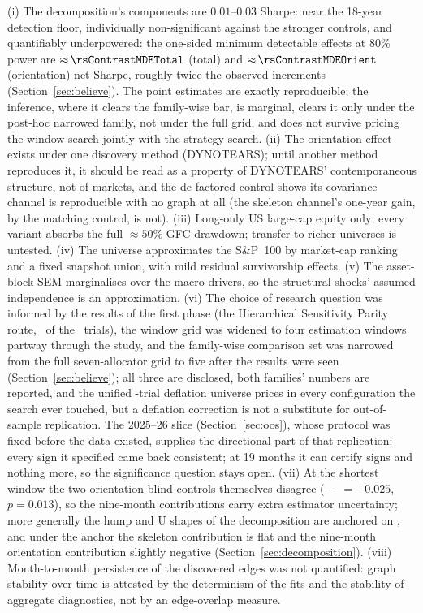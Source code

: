 (i) The decomposition's components are
$0.01$--$0.03$ Sharpe: near the 18-year detection floor, individually
non-significant against the stronger controls, and quantifiably
underpowered: the one-sided minimum detectable effects at $80\%$ power
are ${\approx}\,\rsContrastMDETotal$ (total) and
${\approx}\,\rsContrastMDEOrient$ (orientation) net Sharpe, roughly
twice the observed increments (Section~\ref{sec:believe}).
The point estimates are exactly reproducible; the inference, where it
clears the family-wise bar, is marginal, clears it only under the
post-hoc narrowed family, not under the full grid, and does not survive
pricing the window search jointly with the strategy search.
(ii) The
orientation effect exists under one discovery method (DYNOTEARS); until
another method reproduces it, it should be read as a property of DYNOTEARS'
contemporaneous structure, not of markets, and the de-factored control
shows its covariance channel is reproducible with no graph at all
(the skeleton channel's one-year gain, by the matching control, is
not). (iii) Long-only US
large-cap equity only; every variant absorbs the full ${\approx}50\%$ GFC
drawdown; transfer to richer universes is untested. (iv) The
universe approximates the S\&P~100 by market-cap ranking and a fixed
snapshot union, with mild residual survivorship effects. (v) The
asset-block SEM marginalises over the macro drivers, so the structural
shocks' assumed independence is an approximation. (vi) The choice
of research question was informed by the results of the first phase
(the Hierarchical Sensitivity Parity route, \rsNtrialsPhaseI\ of the
\rsNtrials\ trials), the window grid was widened to four estimation windows partway through
the study, and the family-wise comparison set was narrowed from the
full seven-allocator grid to five after the results were seen
(Section~\ref{sec:believe}); all three are disclosed, both families'
numbers are reported, and the unified
\rsNtrials-trial deflation universe prices in every configuration the
search ever touched, but a deflation correction is not a substitute for
out-of-sample replication. The 2025--26 slice
(Section~\ref{sec:oos}), whose protocol was fixed before the data
existed, supplies the directional part of that
replication: every sign it specified came back
consistent; at 19 months
it can certify signs and nothing more, so the significance question
stays open. (vii) At the shortest window the two
orientation-blind controls themselves disagree (\skelalt{} $-$ \skelsamp{} $= +0.025$,
$p=0.013$), so the nine-month contributions carry extra estimator
uncertainty;
more generally the hump and U shapes of the decomposition are anchored on
\skelsamp{}, and under the \skelalt{} anchor the skeleton contribution is
flat
and the nine-month orientation contribution slightly negative
(Section~\ref{sec:decomposition}). (viii) Month-to-month
persistence of the discovered edges was not quantified: graph stability
over time is attested by the determinism of the fits and the stability of
aggregate diagnostics, not by an edge-overlap measure.

